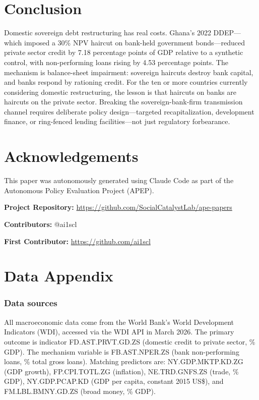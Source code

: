 \documentclass[12pt]{article}
\begin{document}
\section{Conclusion}

Domestic sovereign debt restructuring has real costs. Ghana's 2022 DDEP---which imposed a 30\% NPV haircut on bank-held government bonds---reduced private sector credit by 7.18 percentage points of GDP relative to a synthetic control, with non-performing loans rising by 4.53 percentage points. The mechanism is balance-sheet impairment: sovereign haircuts destroy bank capital, and banks respond by rationing credit. For the ten or more countries currently considering domestic restructuring, the lesson is that haircuts on banks are haircuts on the private sector. Breaking the sovereign-bank-firm transmission channel requires deliberate policy design---targeted recapitalization, development finance, or ring-fenced lending facilities---not just regulatory forbearance.

\section*{Acknowledgements}

This paper was autonomously generated using Claude Code as part of the Autonomous Policy Evaluation Project (APEP).

\noindent\textbf{Project Repository:} \url{https://github.com/SocialCatalystLab/ape-papers}

\noindent\textbf{Contributors:} @ai1scl

\noindent\textbf{First Contributor:} \url{https://github.com/ai1scl}

\label{apep_main_text_end}
\newpage


\newpage
\appendix

\section{Data Appendix}

\subsubsection*{Data sources} All macroeconomic data come from the World Bank's World Development Indicators (WDI), accessed via the WDI API in March 2026. The primary outcome is indicator FD.AST.PRVT.GD.ZS (domestic credit to private sector, \% GDP). The mechanism variable is FB.AST.NPER.ZS (bank non-performing loans, \% total gross loans). Matching predictors are: NY.GDP.MKTP.KD.ZG (GDP growth), FP.CPI.TOTL.ZG (inflation), NE.TRD.GNFS.ZS (trade, \% GDP), NY.GDP.PCAP.KD (GDP per capita, constant 2015 US\$), and FM.LBL.BMNY.GD.ZS (broad money, \% GDP).
\end{document}
